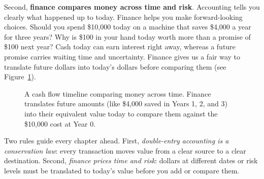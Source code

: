 Second, \textbf{finance compares money across time and risk}. Accounting tells you clearly what happened up to today. Finance helps you make forward-looking choices. Should you spend \$10,000 today on a machine that saves \$4,000 a year for three years? Why is \$100 in your hand today worth more than a promise of \$100 next year? Cash today can earn interest right away, whereas a future promise carries waiting time and uncertainty. Finance gives us a fair way to translate future dollars into today's dollars before comparing them (see Figure~\ref{fig:preface-cashflow-timeline}).

\begin{figure}[htbp]
\centering
{}
\caption{A cash flow timeline comparing money across time. Finance translates future amounts (like \$4,000 saved in Years 1, 2, and 3) into their equivalent value today to compare them against the \$10,000 cost at Year 0.}
\label{fig:preface-cashflow-timeline}
\end{figure}

\begin{focusbox}
Two rules guide every chapter ahead. First, \emph{double-entry accounting is a conservation law}: every transaction moves value from a clear source to a clear destination. Second, \emph{finance prices time and risk}: dollars at different dates or risk levels must be translated to today's value before you add or compare them.
\end{focusbox}

